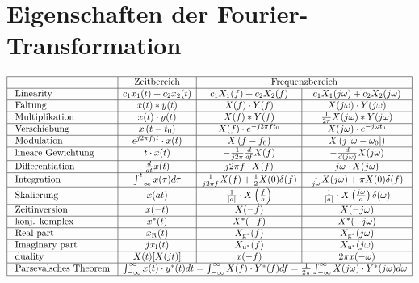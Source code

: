 \section{Eigenschaften der Fourier-Transformation}
$$
\begin{array}{|l|c|c|c|}
\hline & \text { Zeitbereich } & \multicolumn{2}{c|}{\text { Frequenzbereich }} \\
\hline \text { Linearity } & c_1 x_1(t)+c_2 x_2(t) & c_1 X_1(f)+c_2 X_2(f) & c_1 X_1(j \omega)+c_2 X_2(j \omega) \\
\hline \text { Faltung } & x(t) * y(t) & X(f) \cdot Y(f) & X(j \omega) \cdot Y(j \omega) \\
\hline \text { Multiplikation } & x(t) \cdot y(t) & X(f) * Y(f) & \frac{1}{2 \pi} X(j \omega) * Y(j \omega) \\
\hline \text { Verschiebung } & x\left(t-t_0\right) & X(f) \cdot e^{-j 2 \pi f t_0} & X(j \omega) \cdot e^{-j \omega t_0} \\
\hline \text { Modulation } & e^{j 2 \pi f_0 t} \cdot x(t) & X\left(f-f_0\right) & X\left(j\left[\omega-\omega_0\right]\right) \\
\hline \text { lineare Gewichtung } & t \cdot x(t) & -\frac{1}{j 2 \pi} \frac{d}{d f} X(f) & -\frac{d}{d(j \omega)} X(j \omega) \\
\hline \text { Differentiation } & \frac{d}{d t} x(t) & j 2 \pi f \cdot X(f) & j \omega \cdot X(j \omega) \\
\hline \text { Integration } & \int_{-\infty}^t x(\tau) d \tau & \frac{1}{j 2 \pi f} X(f)+ 
\frac{1}{2} X(0) \delta(f) & \frac{1}{j \omega} X(j \omega)+\pi X(0)  \delta(f)\\
\hline \text { Skalierung } & x(a t) & \frac{1}{|a|} \cdot X\left(\frac{f}{a}\right) & \frac{1}{|a|} \cdot X\left(\frac{j \omega}{a}\right)\delta(\omega) \\
\hline \text { Zeitinversion } & x(-t) & X(-f) & X(-j \omega) \\
\hline \text { konj. komplex } & x^*(t) & X^*(-f) & X^*(-j \omega) \\
\hline \text { Real part } & x_{\mathrm{R}}(t) & X_{\mathrm{g}^*}(f) & X_{\mathrm{g}^*}(j \omega) \\
\hline \text { Imaginary part } & j x_{\mathrm{I}}(t) & X_{\mathrm{u}^*}(f) & X_{\mathrm{u}^*}(j \omega) \\
\hline \text { duality } & X(t)[X(j t)] & x(-f) & 2 \pi x(-\omega) \\
\hline \text { Parsevalsches Theorem } & \multicolumn{3}{c|}{\int_{-\infty}^{\infty} x(t) \cdot y^*(t) d t=\int_{-\infty}^{\infty} X(f) \cdot Y^*(f) d f=\frac{1}{2 \pi} \int_{-\infty}^{\infty} X(j \omega) \cdot Y^*(j \omega) d \omega} \\
\hline
\end{array}
$$
